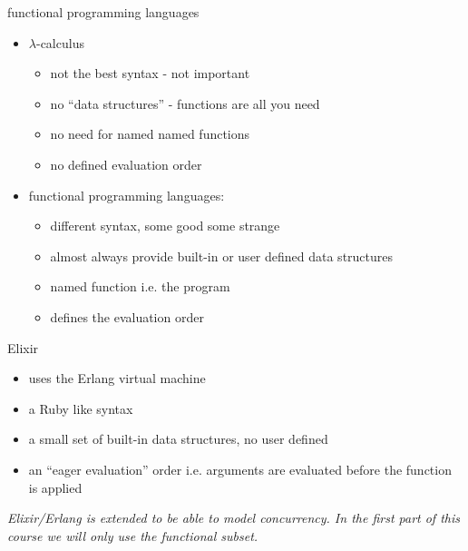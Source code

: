 \begin{frame}{functional programming languages}

 \begin{itemize}
   \pause\item $\lambda$-calculus
       \begin{itemize}        
          \pause \item not the best syntax - not important 
          \pause \item no ``data structures'' - functions are all you need 
          \pause \item no need for named named functions
          \pause \item no defined evaluation order  
       \end{itemize}   
    \pause\item functional programming languages: 
       \begin{itemize}        
            \pause \item different syntax, some good some strange 
            \pause \item almost always provide built-in or user defined data structures 
            \pause \item named function i.e. the program
            \pause \item defines the evaluation order
       \end{itemize}               
 \end{itemize}

\pause\vspace{10pt}{\em All functional programming languages have a core that can be expressed in $\lambda$-calculus.}

\end{frame}

\begin{frame}{Elixir}

 \begin{itemize}
    \pause \item uses the Erlang virtual machine

    \pause \item a Ruby like syntax

    \pause \item a small set of built-in data structures, no user defined 

    \pause \item an ``eager evaluation'' order i.e. arguments are evaluated before the function is applied 
 \end{itemize}

\pause\vspace{40pt}
{\em Elixir/Erlang is extended to be able to model concurrency. In the first part of this course we will only use the functional subset.}

\end{frame}


